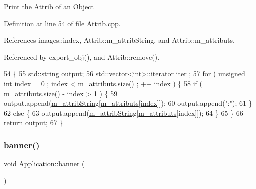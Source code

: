 Print the \hyperlink{classAttrib}{Attrib} of an \hyperlink{classObject}{Object} 

Definition at line 54 of file Attrib.\+cpp.



References images\+::index, Attrib\+::m\+\_\+attrib\+String, and Attrib\+::m\+\_\+attributs.



Referenced by export\+\_\+obj(), and Attrib\+::remove().


\begin{DoxyCode}
54                             \{
55   std::string output;
56   std::vector<int>::iterator iter ;
57   \textcolor{keywordflow}{for} ( \textcolor{keywordtype}{unsigned} \textcolor{keywordtype}{int} \hyperlink{namespaceimages_a54407fd574970b3178647ae096321a57}{index} = 0 ; \hyperlink{namespaceimages_a54407fd574970b3178647ae096321a57}{index} < \hyperlink{classAttrib_ac4bd58a0cc6b38a3b711d609a3d3aacc}{m\_attributs}.size() ; ++
      \hyperlink{namespaceimages_a54407fd574970b3178647ae096321a57}{index} ) \{
58     \textcolor{keywordflow}{if} ( \hyperlink{classAttrib_ac4bd58a0cc6b38a3b711d609a3d3aacc}{m\_attributs}.size() - \hyperlink{namespaceimages_a54407fd574970b3178647ae096321a57}{index} > 1 ) \{
59       output.append(\hyperlink{classAttrib_a3414521d7a82476e874b25a5407b5e63}{m\_attribString}[\hyperlink{classAttrib_ac4bd58a0cc6b38a3b711d609a3d3aacc}{m\_attributs}[\hyperlink{namespaceimages_a54407fd574970b3178647ae096321a57}{index}]]);
60       output.append(\textcolor{stringliteral}{":"});
61     \}
62     \textcolor{keywordflow}{else} \{
63       output.append(\hyperlink{classAttrib_a3414521d7a82476e874b25a5407b5e63}{m\_attribString}[\hyperlink{classAttrib_ac4bd58a0cc6b38a3b711d609a3d3aacc}{m\_attributs}[index]]);
64     \}
65   \}
66   \textcolor{keywordflow}{return} output;
67 \}
\end{DoxyCode}
\mbox{\label{classApplication_af168aa3579262d65adc0bd4531361a53}} 
\subsubsection{\texorpdfstring{banner()}{banner()}}
{\footnotesize\ttfamily void Application\+::banner (\begin{DoxyParamCaption}{ }\end{DoxyParamCaption})}

